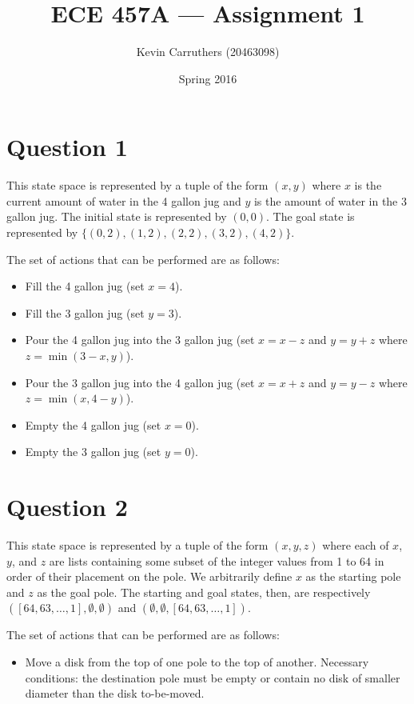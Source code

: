 \documentclass[12pt]{article}
\begin{document}
\title{ECE 457A --- Assignment 1}
\author{Kevin Carruthers (20463098)}
\date{\vspace{-2ex}Spring 2016}
\maketitle\HRule

\section*{Question 1}
This state space is represented by a tuple of the form $(x, y)$ where $x$ is the current amount of water in the 4 gallon jug and $y$ is the amount of water in the 3 gallon jug. The initial state is represented by $(0, 0)$. The goal state is represented by $\{(0, 2), (1, 2), (2, 2), (3, 2), (4, 2)\}$.

The set of actions that can be performed are as follows:
\begin{itemize}
\item Fill the 4 gallon jug (set $x = 4$).
\item Fill the 3 gallon jug (set $y = 3$).
\item Pour the 4 gallon jug into the 3 gallon jug (set $x = x - z$ and $y = y + z$ where $z = \min(3 - x, y)$).
\item Pour the 3 gallon jug into the 4 gallon jug (set $x = x + z$ and $y = y - z$ where $z = \min(x, 4 - y)$).
\item Empty the 4 gallon jug (set $x = 0$).
\item Empty the 3 gallon jug (set $y = 0$).
\end{itemize}

\section*{Question 2}
This state space is represented by a tuple of the form $(x, y, z)$ where each of $x$, $y$, and $z$ are lists containing some subset of the integer values from 1 to 64 in order of their placement on the pole. We arbitrarily define $x$ as the starting pole and $z$ as the goal pole. The starting and goal states, then, are respectively $([64, 63, \dots, 1], \emptyset, \emptyset)$ and $(\emptyset, \emptyset, [64, 63, \dots, 1])$.

The set of actions that can be performed are as follows:
\begin{itemize}
\item Move a disk from the top of one pole to the top of another. Necessary conditions: the destination pole must be empty or contain no disk of smaller diameter than the disk to-be-moved.
\end{itemize}
\end{document}
